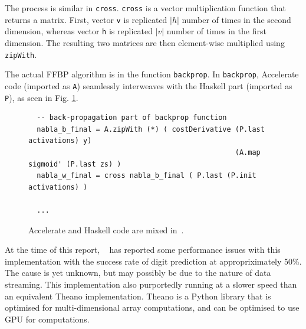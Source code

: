 The process is similar in \texttt{cross}. \texttt{cross} is a vector multiplication function that returns a matrix. First, vector \texttt{v} is replicated $|h|$ number of times in the second dimension, whereas vector \texttt{h} is replicated $|v|$ number of times in the first dimension. The resulting two matrices are then element-wise multiplied using \texttt{zipWith}. 

The actual FFBP algorithm is in the function \texttt{backprop}. In \texttt{backprop}, Accelerate code (imported as \texttt{A}) seamlessly interweaves with the Haskell part (imported as \texttt{P}), as seen in Fig. \ref{fig:acc-functions4}.
\begin{figure}
  \begin{lstlisting}
  -- back-propagation part of backprop function
  nabla_b_final = A.zipWith (*) ( costDerivative (P.last activations) y) 
                                                 (A.map sigmoid' (P.last zs) )
  nabla_w_final = cross nabla_b_final ( P.last (P.init activations) )
  
  ...
  \end{lstlisting}
  \caption{Accelerate and Haskell code are mixed in~\cite{Eve16}.}
  \label{fig:acc-functions4}
\end{figure}

At the time of this report, ~\cite{Eve16} has reported some performance issues with this implementation with the success rate of digit prediction at appropriximately 50\%. The cause is yet unknown, but may possibly be due to the nature of data streaming. This implementation also purportedly running at a slower speed than an equivalent Theano implementation. Theano is a Python library that is optimised for multi-dimensional array computations, and can be optimised to use GPU for computations.